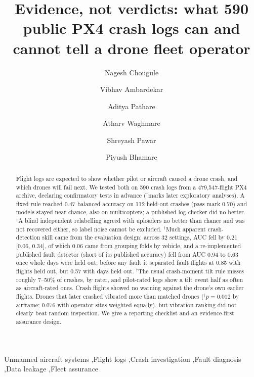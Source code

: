 \documentclass[preprint,12pt]{elsarticle}
\begin{document}
\begin{frontmatter}

\title{Evidence, not verdicts: what 590 public PX4 crash logs can and cannot tell a drone fleet operator}

\author[a]{Nagesh Chougule}
\author[a]{Vibhav Ambardekar}
\author[a]{Aditya Pathare}
\author[a]{Atharv Waghmare}
\author[a]{Shreyash Pawar}
\author[a]{Piyush Bhamare}

\begin{abstract}\small
Flight logs are expected to show whether pilot or aircraft caused a drone crash, and which drones will fail next. We tested both on 590 crash logs from a 479,547-flight PX4 archive, declaring confirmatory tests in advance ($^\dagger$marks later exploratory analyses). A fixed rule reached 0.47 balanced accuracy on 112 held-out crashes (pass mark 0.70) and models stayed near chance, also on multicopters; a published log checker did no better. $^\dagger$A blind independent relabelling agreed with uploaders no better than chance and was not recovered either, so label noise cannot be excluded. $^\dagger$Much apparent crash-detection skill came from the evaluation design: across 32 settings, AUC fell by 0.21 [0.06, 0.34], of which 0.06 came from grouping folds by vehicle, and a re-implemented published fault detector (short of its published accuracy) fell from AUC 0.94 to 0.63 once whole days were held out; before any fault it separated fault flights at 0.85 with flights held out, but 0.57 with days held out. $^\dagger$The usual crash-moment tilt rule misses roughly 7--50\% of crashes, by rater, and pilot-rated logs show a tilt event half as often as aircraft-rated ones. Crash flights showed no warning against the drone's own earlier flights. Drones that later crashed vibrated more than matched drones ($^\dagger$$p=0.012$ by airframe; 0.076 with operator sites weighted equally), but vibration ranking did not clearly beat random inspection. We give a reporting checklist and an evidence-first assurance design.
\end{abstract}

\begin{keyword}
Unmanned aircraft systems \sep Flight logs \sep Crash investigation \sep Fault diagnosis \sep Data leakage \sep Fleet assurance
\end{keyword}

\end{frontmatter}
\clearpage
\end{document}
